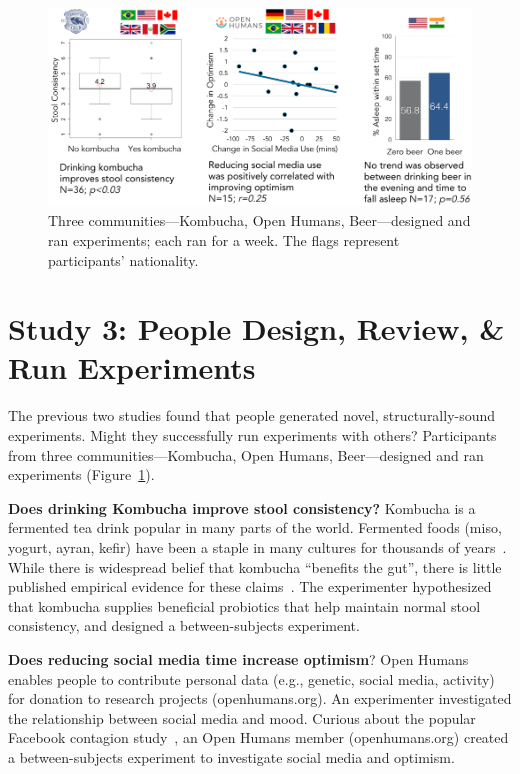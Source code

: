 \begin{figure}[h] 
\centering
  \includegraphics[width=1.0\textwidth]{figures/galileo/galileo-study3}
  \caption[Three communities---Kombucha, Open Humans, Beer---designed and ran experiments]
{Three communities---Kombucha, Open Humans, Beer---designed and ran experiments; each ran for a week. The flags represent participants' nationality. }
  \label{fig:galileo-result3}
\end{figure}
\section{Study 3: People Design, Review, \& Run Experiments}
The previous two studies found that people generated novel, structurally-sound experiments. Might they successfully run experiments with others? Participants from three communities---Kombucha, Open Humans, Beer---designed and ran experiments (Figure~\ref{fig:galileo-result3}).  

\textbf{Does drinking Kombucha improve stool consistency?} Kombucha is a fermented tea drink popular in many parts of the world. Fermented foods (miso, yogurt, ayran, kefir) have been a staple in many cultures for thousands of years~\cite{Chilton2015}. While there is widespread belief that kombucha “benefits the gut”, there is little published empirical evidence for these claims~\cite{Ernst2003}. The experimenter hypothesized that kombucha supplies beneficial probiotics that help maintain normal stool consistency, and designed a between-subjects experiment.

\textbf{Does reducing social media time increase optimism}? Open Humans enables people to contribute personal data (e.g., genetic, social media, activity) for donation to research projects (openhumans.org). An experimenter investigated the relationship between social media and mood. Curious about the popular Facebook contagion study~\cite{Coviello2014}, an Open Humans member (openhumans.org) created a between-subjects experiment to investigate social media and optimism.

